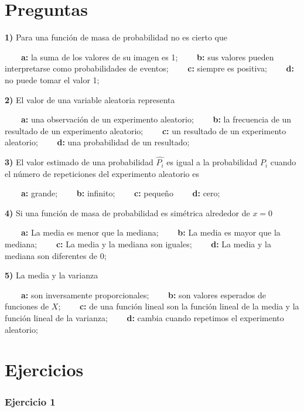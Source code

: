 \documentclass[
]{book}
\begin{document}
\hypertarget{preguntas-3}{%
\section{Preguntas}\label{preguntas-3}}

\textbf{1)} Para una función de masa de probabilidad no es cierto que

\textbf{\(\qquad\)a:} la suma de los valores de su imagen es 1; \textbf{\(\qquad\)b:} sus valores pueden interpretarse como probabilidades de eventos;
\textbf{\(\qquad\)c:} siempre es positiva;
\textbf{\(\qquad\)d:} no puede tomar el valor 1;

\textbf{2)} El valor de una variable aleatoria representa

\textbf{\(\qquad\)a:} una observación de un experimento aleatorio; \textbf{\(\qquad\)b:} la frecuencia de un resultado de un experimento aleatorio;
\textbf{\(\qquad\)c:} un resultado de un experimento aleatorio;
\textbf{\(\qquad\)d:} una probabilidad de un resultado;

\textbf{3)} El valor estimado de una probabilidad \(\hat{P_i}\) es igual a la probabilidad \(P_i\) cuando el número de repeticiones del experimento aleatorio es

\textbf{\(\qquad\)a:} grande; \textbf{\(\qquad\)b:} infinito;
\textbf{\(\qquad\)c:} pequeño
\textbf{\(\qquad\)d:} cero;

\textbf{4)} Si una función de masa de probabilidad es simétrica alrededor de \(x=0\)

\textbf{\(\qquad\)a:} La media es menor que la mediana; \textbf{\(\qquad\)b:} La media es mayor que la mediana;
\textbf{\(\qquad\)c:} La media y la mediana son iguales;
\textbf{\(\qquad\)d:} La media y la mediana son diferentes de 0;

\textbf{5)} La media y la varianza

\textbf{\(\qquad\)a:} son inversamente proporcionales; \textbf{\(\qquad\)b:} son valores esperados de funciones de \(X\);
\textbf{\(\qquad\)c:} de una función lineal son la función lineal de la media y la función lineal de la varianza;
\textbf{\(\qquad\)d:} cambia cuando repetimos el experimento aleatorio;

\hypertarget{ejercicios-3}{%
\section{Ejercicios}\label{ejercicios-3}}

\hypertarget{ejercicio-1-2}{%
\subsubsection{Ejercicio 1}\label{ejercicio-1-2}}
\end{document}
